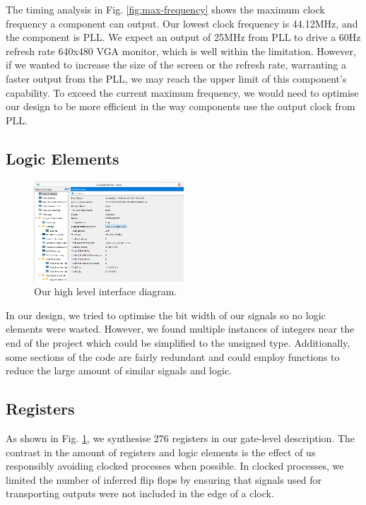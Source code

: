 \documentclass[conference]{IEEEtran}
\begin{document}
The timing analysis in Fig. \ref{fig:max-frequency} shows the maximum clock frequency a component can output. Our lowest clock frequency is 44.12MHz, and the component is PLL. We expect an output of 25MHz from PLL to drive a 60Hz refresh rate 640x480 VGA monitor, which is well within the limitation. However, if we wanted to increase the size of the screen or the refresh rate, warranting a faster output from the PLL, we may reach the upper limit of this component's capability. To exceed the current maximum frequency, we would need to optimise our design to be more efficient in the way components use the output clock from PLL.

\subsection{Logic Elements}
\begin{figure}[htbp]
    \centerline{\includegraphics[width=0.5\textwidth]{logic-elements.png}}
    \caption{Our high level interface diagram.}
    \label{fig:logic-elements}
\end{figure}

In our design, we tried to optimise the bit width of our signals so no logic elements were wasted. However, we found multiple instances of integers near the end of the project which could be simplified to the unsigned type. Additionally, some sections of the code are fairly redundant and could employ functions to reduce the large amount of similar signals and logic.

\subsection{Registers}
As shown in Fig. \ref{fig:logic-elements}, we synthesise 276 registers in our gate-level description. The contrast in the amount of registers and logic elements is the effect of us responsibly avoiding clocked processes when possible. In clocked processes, we limited the number of inferred flip flops by ensuring that signals used for transporting outputs were not included in the edge of a clock.
\end{document}
